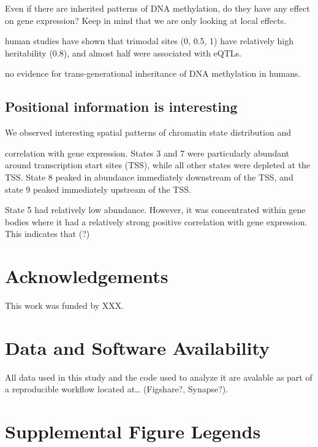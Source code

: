 \documentclass[10pt,letterpaper]{article}
\begin{document}
Even if there are inherited patterns of DNA methylation, do they have
any effect on gene expression? Keep in mind that we are only looking at
local effects.

human studies have shown that trimodal sites (0, 0.5, 1) have relatively
high heritability (0.8), and almost half were associated with eQTLs.

no evidence for trans-generational inheritance of DNA methylation in
humans.

\hypertarget{positional-information-is-interesting}{%
\subsection{Positional information is
interesting}\label{positional-information-is-interesting}}

We observed interesting spatial patterns of chromatin state distribution
and

correlation with gene expression. States 3 and 7 were particularly
abundant around transcription start sites (TSS), while all other states
were depleted at the TSS. State 8 peaked in abundance immediately
downstream of the TSS, and state 9 peaked immediately upstream of the
TSS.

State 5 had relatively low abundance. However, it was concentrated
within gene bodies where it had a relatively strong positive correlation
with gene expression. This indicates that (?)

\hypertarget{acknowledgements}{%
\section{Acknowledgements}\label{acknowledgements}}

This work was funded by XXX.

\hypertarget{data-and-software-availability}{%
\section{Data and Software
Availability}\label{data-and-software-availability}}

All data used in this study and the code used to analyze it are avalable
as part of a reproducible workflow located at\ldots{} (Figshare?,
Synapse?).

\hypertarget{supplemental-figure-legends}{%
\section{Supplemental Figure
Legends}\label{supplemental-figure-legends}}
\end{document}
